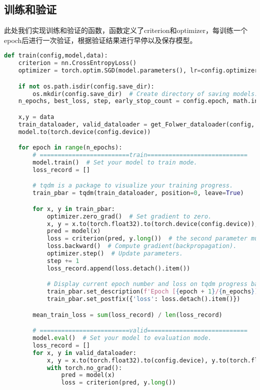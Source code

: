 \documentclass[lang=cn,a4paper]{elegantpaper}
\begin{document}
\subsection{训练和验证}

此处我们实现训练和验证的函数，函数定义了criterion和optimizer，每训练一个epoch后进行一次验证，根据验证结果进行早停以及保存模型。

\begin{lstlisting}[language = python]
  def train(config,model,data):
    criterion = nn.CrossEntropyLoss()
    optimizer = torch.optim.SGD(model.parameters(), lr=config.optimizer.lr, momentum=config.optimizer.momentum)

    if not os.path.isdir(config.save_dir):
        os.mkdir(config.save_dir)  # Create directory of saving models.
    n_epochs, best_loss, step, early_stop_count = config.epoch, math.inf, 0, 0

    x,y = data
    train_dataloader, valid_dataloader = get_Folwer_dataloader(config, x, y)
    model.to(torch.device(config.device))

    for epoch in range(n_epochs):
        # =========================train============================
        model.train()  # Set your model to train mode.
        loss_record = []

        # tqdm is a package to visualize your training progress.
        train_pbar = tqdm(train_dataloader, position=0, leave=True)

        for x, y in train_pbar:
            optimizer.zero_grad()  # Set gradient to zero.
            x, y = x.to(torch.float32).to(torch.device(config.device)), y.to(torch.float32).to(torch.device(config.device))  # Move your data to config.device.
            pred = model(x)
            loss = criterion(pred, y.long())  # the second parameter must be long
            loss.backward()  # Compute gradient(backpropagation).
            optimizer.step()  # Update parameters.
            step += 1
            loss_record.append(loss.detach().item())

            # Display current epoch number and loss on tqdm progress bar.
            train_pbar.set_description(f'Epoch [{epoch + 1}/{n_epochs}]')
            train_pbar.set_postfix({'loss': loss.detach().item()})

        mean_train_loss = sum(loss_record) / len(loss_record)

        # =========================valid============================
        model.eval()  # Set your model to evaluation mode.
        loss_record = []
        for x, y in valid_dataloader:
            x, y = x.to(torch.float32).to(config.device), y.to(torch.float32).to(config.device)
            with torch.no_grad():
                pred = model(x)
                loss = criterion(pred, y.long())


\end{lstlisting}
\end{document}
